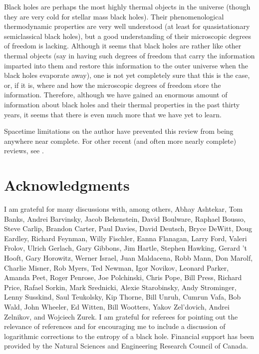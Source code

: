 \documentclass[12pt]{article} \usepackage{latexsym} \textwidth 15cm
\begin{document}
Black holes are perhaps the most highly thermal objects in the
universe (though they are very cold for stellar mass black holes).
Their phenomenological thermodynamic properties are very well
understood (at least for quasistationary semiclassical black holes),
but a good understanding of their microscopic degrees of freedom is
lacking.  Although it seems that black holes are rather like other
thermal objects (say in having such degrees of freedom that carry the
information imparted into them and restore this information to the
outer universe when the black holes evaporate away), one is not yet
completely sure that this is the case, or, if it is, where and how the
microscopic degrees of freedom store the information.  Therefore,
although we have gained an enormous amount of information about black
holes and their thermal properties in the past thirty years, it seems
that there is even much more that we have yet to learn.

Spacetime limitations on the author have prevented this review from
being anywhere near complete.  For other recent (and often more nearly
complete) reviews, see
\cite{Frolov96,Wald97,Sor3,Jacobson97,FF,Mukohyama98,Kiefer99,
Jacobson99,Mukohyama99,Wald99,Majumdar0,Majumdar1,Kiefer02,
Israel03,Jacobson03,Damour,Das,Fursaev}.

\section*{Acknowledgments}

I am grateful for many discussions with, among others, Abhay Ashtekar,
Tom Banks, Andrei Barvinsky, Jacob Bekenstein, David Boulware, Raphael
Bousso, Steve Carlip, Brandon Carter, Paul Davies, David Deutsch, Bryce
DeWitt, Doug Eardley, Richard Feynman, Willy Fischler, Eanna Flanagan,
Larry Ford, Valeri Frolov, Ulrich Gerlach, Gary Gibbons, Jim Hartle,
Stephen Hawking, Gerard 't Hooft, Gary Horowitz, Werner Israel, Juan
Maldacena, Robb Mann, Don Marolf, Charlie Misner, Rob Myers, Ted
Newman, Igor Novikov, Leonard Parker, Amanda Peet, Roger Penrose, Joe
Polchinski, Chris Pope, Bill Press, Richard Price, Rafael Sorkin, Mark
Srednicki, Alexie Starobinsky, Andy Strominger, Lenny Susskind, Saul
Teukolsky, Kip Thorne, Bill Unruh, Cumrun Vafa, Bob Wald, John Wheeler,
Ed Witten, Bill Wootters, Yakov Zel'dovich, Andrei Zelnikov, and
Wojciech Zurek.  I am grateful for referees for pointing out the
relevance of references \cite{Par1,Par2,Par3,Par4,Full1,Full2} and for
encouraging me to include a discussion of logarithmic corrections to
the entropy of a black hole.  Financial support has been provided by
the Natural Sciences and Engineering Research Council of Canada.
\end{document}
